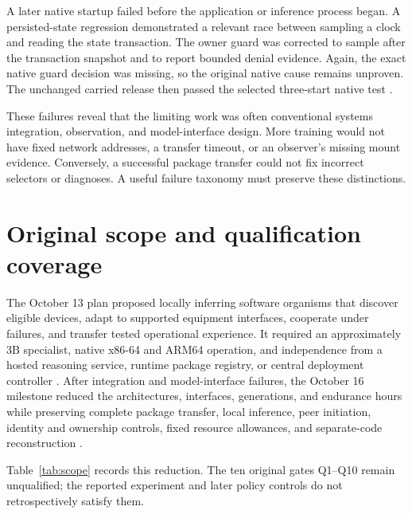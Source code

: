 \documentclass[11pt,letterpaper]{article}
\begin{document}
A later native startup failed before the application or inference process
began. A persisted-state regression demonstrated a relevant race between
sampling a clock and reading the state transaction. The owner guard was
corrected to sample after the transaction snapshot and to report bounded denial
evidence. Again, the exact native guard decision was missing, so the original
native cause remains unproven. The unchanged carried release then passed the
selected three-start native test \cite{nativehistory,reduced}.

These failures reveal that the limiting work was often conventional systems
integration, observation, and model-interface design. More training would not
have fixed network addresses, a transfer timeout, or an observer's missing
mount evidence. Conversely, a successful package transfer could not fix
incorrect selectors or diagnoses. A useful failure taxonomy must preserve
these distinctions.

\section{Original scope and qualification coverage}
\label{app:gates}

The October 13 plan proposed locally inferring software organisms that discover
eligible devices, adapt to supported equipment interfaces, cooperate under
failures, and transfer tested operational experience. It required an
approximately 3B specialist, native x86-64 and ARM64 operation, and independence
from a hosted reasoning service, runtime package registry, or central deployment
controller \cite{original}. After integration and model-interface failures, the
October 16 milestone reduced the architectures, interfaces, generations, and
endurance hours while preserving complete package transfer, local inference,
peer initiation, identity and ownership controls, fixed resource allowances,
and separate-code reconstruction \cite{reduced}.

Table~\ref{tab:scope} records this reduction. The ten original gates Q1--Q10
remain unqualified; the reported experiment and later policy controls do not
retrospectively satisfy them.
\end{document}

